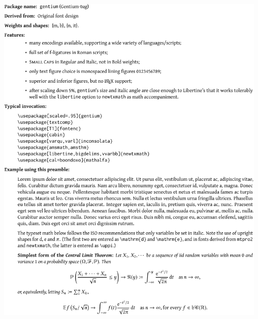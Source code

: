 \documentclass{article}
\begin{document}
\newpage
\hypertarget{lnk:gentium}{}
\includegraphics{gensamp-crop}
\newpage
\hypertarget{lnk:zi4}{}
\end{document}
